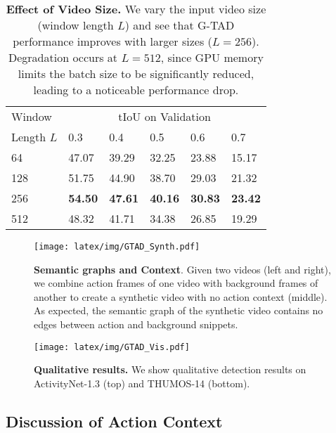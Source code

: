 \documentclass[10pt,twocolumn,letterpaper]{article}
\begin{document}
\begin{table}[!tb]
\centering
\caption{\textbf{Effect of Video Size.} We vary the input video size (window length $L$) and see that G-TAD performance improves with larger sizes ($L=256$). Degradation occurs at $L=512$, since GPU memory limits the batch size to be significantly reduced, leading to a noticeable  performance drop.}
\small
\begin{tabular}{p{1.5cm}<{\centering}|p{0.6cm}<{\centering}p{0.6cm}<{\centering}p{0.6cm}<{\centering}p{0.6cm}<{\centering}p{0.6cm}<{\centering}}
\hline
Window & \multicolumn{5}{c}{tIoU on Validation}  \\
    Length $L$    &  0.3 &  0.4 &  0.5 &  0.6 &  0.7 \\ \hline
    64              &47.07&39.29& 32.25 &23.88& 15.17\\
    128             & 51.75 & 44.90 & 38.70 & 29.03 & 21.32\\
    256             & \textbf{54.50} & \textbf{47.61} & \textbf{40.16} & \textbf{30.83} & \textbf{23.42} \\
    512             & 48.32 & 41.71 & 34.38 & 26.85 & 19.29 \\ \hline
\end{tabular}
\label{tab:abl_window}
\end{table}

\begin{figure}
    \centering
\texttt{[image: latex/img/GTAD\_Synth.pdf]}
    \caption{\textbf{Semantic graphs and Context}. Given two videos (left and right), we combine action frames of one video with background frames of another to create a synthetic video with no action context (middle). As expected, the semantic graph of the synthetic video contains no edges between action and background snippets. 
} 
    \label{fig:qual_results}
\end{figure}

\begin{figure*}[!h]
    \centering
    \vspace{-0.5cm}
    \texttt{[image: latex/img/GTAD\_Vis.pdf]}
    \caption{\textbf{Qualitative results.} We show qualitative detection results on ActivityNet-1.3 (top) and THUMOS-14 (bottom).}
    \label{fig:vis_video_THUMOS}
\end{figure*}

\subsection{Discussion of Action Context} 
\end{document}
